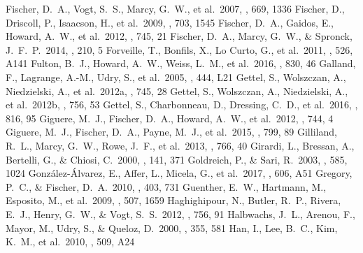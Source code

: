 \documentclass[twocolumn]{aastex62}
\begin{document}
\begin{CJK*}{UTF8}{min}
\begin{thebibliography}{}
 Fischer, D.~A., Vogt, S.~S., Marcy, G.~W., et al.\ 2007, \apj, 669, 1336
 Fischer, D., Driscoll, P., Isaacson, H., et al.\ 2009, \apj, 703, 1545
 Fischer, D.~A., Gaidos, E., Howard, A.~W., et al.\ 2012, \apj, 745, 21
 Fischer, D.~A., Marcy, G.~W., \& Spronck, J.~F.~P.\ 2014, \apjs, 210, 5
 Forveille, T., Bonfils, X., Lo Curto, G., et al.\ 2011, \aap, 526, A141
 Fulton, B.~J., Howard, A.~W., Weiss, L.~M., et al.\ 2016, \apj, 830, 46
 Galland, F., Lagrange, A.-M., Udry, S., et al.\ 2005, \aap, 444, L21
 Gettel, S., Wolszczan, A., Niedzielski, A., et al.\ 2012a, \apj, 745, 28
 Gettel, S., Wolszczan, A., Niedzielski, A., et al.\ 2012b, \apj, 756, 53
 Gettel, S., Charbonneau, D., Dressing, C.~D., et al.\ 2016, \apj, 816, 95
 Giguere, M.~J., Fischer, D.~A., Howard, A.~W., et al.\ 2012, \apj, 744, 4
 Giguere, M.~J., Fischer, D.~A., Payne, M.~J., et al.\ 2015, \apj, 799, 89
 Gilliland, R.~L., Marcy, G.~W., Rowe, J.~F., et al.\ 2013, \apj, 766, 40
 Girardi, L., Bressan, A., Bertelli, G., \& Chiosi, C.\ 2000, \aaps, 141, 371
 Goldreich, P., \& Sari, R.\ 2003, \apj, 585, 1024
 Gonz{\'a}lez-{\'A}lvarez, E., Affer, L., Micela, G., et al.\ 2017, \aap, 606, A51
 Gregory, P.~C., \& Fischer, D.~A.\ 2010, \mnras, 403, 731
 Guenther, E.~W., Hartmann, M., Esposito, M., et al.\ 2009, \aap, 507, 1659
 Haghighipour, N., Butler, R.~P., Rivera, E.~J., Henry, G.~W., \& Vogt, S.~S.\ 2012, \apj, 756, 91
 Halbwachs, J.~L., Arenou, F., Mayor, M., Udry, S., \& Queloz, D.\ 2000, \aap, 355, 581
 Han, I., Lee, B.~C., Kim, K.~M., et al.\ 2010, \aap, 509, A24

\end{thebibliography}
\end{CJK*}
\end{document}
